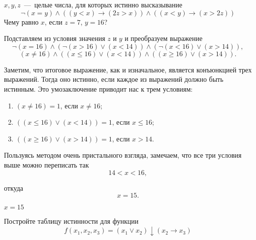 
\setcounter{example}{0}

\begin{exercise}
	$x, y, z$~---~целые числа, для которых истинно высказывание
\begin{equation}
		\neg(x=y)\wedge((y<x)\rightarrow(2z>x))\wedge((x<y)\rightarrow(x>2z))
		\label{true_eq}
\end{equation}
	Чему равно $x$, если $z=7$, $y=16$?
\end{exercise}

\begin{solution}
	Подставляем из условия значения $z$ и $y$ и преобразуем выражение 
	$$
		\neg(x=16)\wedge(\neg(x>16)\vee(x<14))\wedge(\neg(x<16)\vee(x>14)),
	$$
	$$
		(x\neq16)\wedge((x\leqslant16)\vee(x<14))\wedge((x\geqslant16)\vee(x>14)).
	$$
	
	Заметим, что итоговое выражение, как и изначальное, является конъюнкцией
	трех выражений. Тогда оно истинно, если каждое из выражений должно быть
	истинным. Это умозаключение приводит нас к трем условиям:
\begin{enumerate}
	\item $(x\neq16)=1$, если $x\neq16$;
	\item $((x\leqslant16)\vee(x<14))=1$, если $x\leqslant16$;
	\item $((x\geqslant16)\vee(x>14))=1$, если $x>14$.
\end{enumerate}
	
	Пользуясь методом очень пристального взгляда, замечаем, что
	все три условия выше можно переписать так
	$$14<x<16,$$

	\noindent откуда
	$$x=15.$$
\end{solution}

\begin{answer}
	$x=15$
\end{answer}

\begin{exercise}
Постройте таблицу истинности для функции
\begin{equation}
		f(x_1,x_2,x_3)=(x_1\vee x_2)\downarrow(x_2\rightarrow x_3)
		\label{true_eq}
\end{equation}

\end{exercise}

